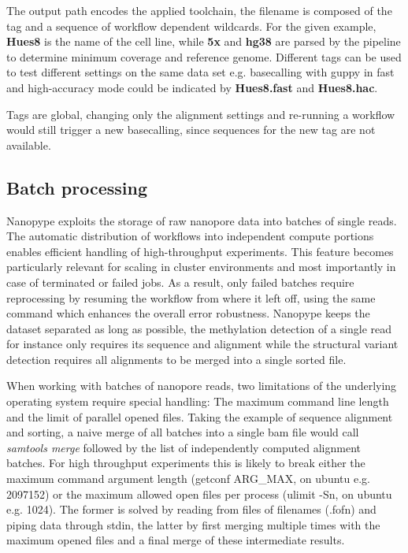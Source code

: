 The output path encodes the applied toolchain, the filename is composed of the tag and a sequence of workflow dependent wildcards. For the given example, \textbf{Hues8} is the name of the cell line, while \textbf{5x} and \textbf{hg38} are parsed by the pipeline to determine minimum coverage and reference genome. Different tags can be used to test different settings on the same data set e.g. basecalling with guppy in fast and high-accuracy mode could be indicated by \textbf{Hues8.fast} and \textbf{Hues8.hac}.

Tags are global, changing only the alignment settings and re-running a workflow would still trigger a new basecalling, since sequences for the new tag are not available. 


\subsection{Batch processing}
\label{subsec:nanopype:batchprocessing}
Nanopype exploits the storage of raw nanopore data into batches of single reads. The automatic distribution of workflows into independent compute portions enables efficient handling of high-throughput experiments. This feature becomes particularly relevant for scaling in cluster environments and most importantly in case of terminated or failed jobs. As a result, only failed batches require reprocessing by resuming the workflow from where it left off, using the same command which enhances the overall error robustness. Nanopype keeps the dataset separated as long as possible, the methylation detection of a single read for instance only requires its sequence and alignment while the structural variant detection requires all alignments to be merged into a single sorted file.

When working with batches of nanopore reads, two limitations of the underlying operating system require special handling: The maximum command line length and the limit of parallel opened files. Taking the example of sequence alignment and sorting, a naive merge of all batches into a single bam file would call \textit{samtools merge} followed by the list of independently computed alignment batches. For high throughput experiments this is likely to break either the maximum command argument length (getconf ARG\_MAX, on ubuntu e.g. 2097152) or the maximum allowed open files per process (ulimit -Sn, on ubuntu e.g. 1024). The former is solved by reading from files of filenames (.fofn) and piping data through stdin, the latter by first merging multiple times with the maximum opened files and a final merge of these intermediate results.


